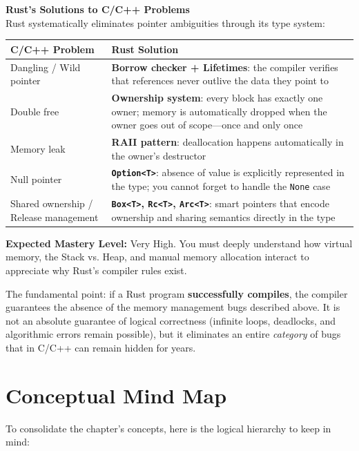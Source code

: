 \begin{examprioritybox}
\textbf{Rust's Solutions to C/C++ Problems} \\
Rust systematically eliminates pointer ambiguities through its type system:

\begin{center}
\begin{tabular}{|l|p{9cm}|}
\hline
\textbf{C/C++ Problem} & \textbf{Rust Solution} \\
\hline
Dangling / Wild pointer & \textbf{Borrow checker + Lifetimes}: the compiler verifies that references never outlive the data they point to \\
\hline
Double free & \textbf{Ownership system}: every block has exactly one owner; memory is automatically dropped when the owner goes out of scope---once and only once \\
\hline
Memory leak & \textbf{RAII pattern}: deallocation happens automatically in the owner's destructor \\
\hline
Null pointer & \textbf{\texttt{Option<T>}}: absence of value is explicitly represented in the type; you cannot forget to handle the \texttt{None} case \\
\hline
Shared ownership / Release management & \textbf{\texttt{Box<T>}, \texttt{Rc<T>}, \texttt{Arc<T>}}: smart pointers that encode ownership and sharing semantics directly in the type \\
\hline
\end{tabular}
\end{center}

\textbf{Expected Mastery Level:} Very High. You must deeply understand how virtual memory, the Stack vs. Heap, and manual memory allocation interact to appreciate why Rust's compiler rules exist.
\end{examprioritybox}

The fundamental point: if a Rust program \textbf{successfully compiles}, the compiler guarantees the absence of the memory management bugs described above. It is not an absolute guarantee of logical correctness (infinite loops, deadlocks, and algorithmic errors remain possible), but it eliminates an entire \emph{category} of bugs that in C/C++ can remain hidden for years.

\section{Conceptual Mind Map}

To consolidate the chapter's concepts, here is the logical hierarchy to keep in mind:

